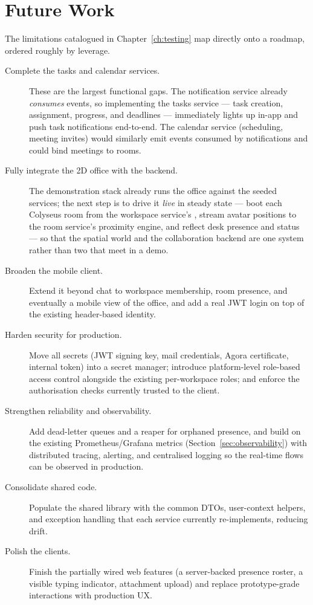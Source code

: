 \section{Future Work}

The limitations catalogued in Chapter~\ref{ch:testing} map directly onto a
roadmap, ordered roughly by leverage.

\begin{description}
  \item[Complete the tasks and calendar services.] These are the largest
  functional gaps. The notification service already \emph{consumes}
   events, so implementing the tasks service --- task
  creation, assignment, progress, and deadlines --- immediately lights up in-app
  and push task notifications end-to-end. The calendar service (scheduling,
  meeting invites) would similarly emit events consumed by notifications and could
  bind meetings to rooms.

  \item[Fully integrate the 2D office with the backend.] The demonstration stack
  already runs the office against the seeded services; the next step is to drive
  it \emph{live} in steady state --- boot each Colyseus room from the workspace
  service's , stream avatar positions to the room service's
  proximity engine, and reflect desk presence and status --- so that the spatial
  world and the collaboration backend are one system rather than two that meet in
  a demo.

  \item[Broaden the mobile client.] Extend it beyond chat to workspace membership,
  room presence, and eventually a mobile view of the office, and add a real JWT
  login on top of the existing header-based identity.

  \item[Harden security for production.] Move all secrets (JWT signing key, mail
  credentials, Agora certificate, internal token) into a secret manager; introduce
  platform-level role-based access control alongside the existing per-workspace
  roles; and enforce the authorisation checks currently trusted to the client.

  \item[Strengthen reliability and observability.] Add dead-letter queues and a
  reaper for orphaned presence, and build on the existing Prometheus/Grafana
  metrics (Section~\ref{sec:observability}) with distributed tracing, alerting,
  and centralised logging so the real-time flows can be observed in production.

  \item[Consolidate shared code.] Populate the shared library with the common
  DTOs, user-context helpers, and exception handling that each service currently
  re-implements, reducing drift.

  \item[Polish the clients.] Finish the partially wired web features (a
  server-backed presence roster, a visible typing indicator, attachment upload)
  and replace prototype-grade interactions with production UX.
\end{description}

